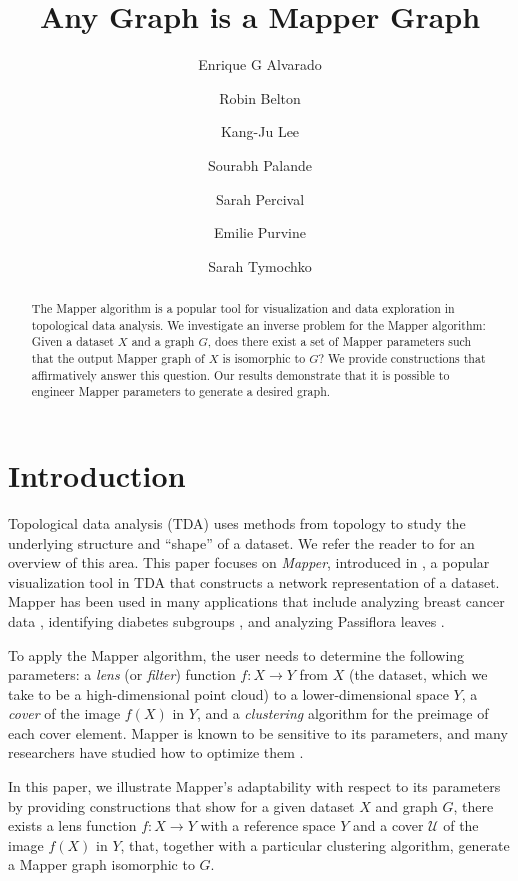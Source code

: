 \documentclass[reqno,oneside,11pt]{amsart}
\title[Any Graph is a Mapper Graph]
    {Any Graph is a Mapper Graph}
\author[Enrique G Alvarado]{Enrique G Alvarado}
\author[Robin Belton]{Robin Belton}
\author[Kang-Ju Lee]{Kang-Ju Lee}
\author[Sourabh Palande]{Sourabh Palande}
\author[Sarah Percival]{Sarah Percival}
\author[Emilie Purvine]{Emilie Purvine}
\author[Sarah Tymochko]{Sarah Tymochko}
\theoremstyle{definition}
\theoremstyle{remark}
\begin{document}
\begin{abstract}
The Mapper algorithm is a popular tool for visualization and data exploration in topological data analysis. We investigate an inverse problem for the Mapper algorithm: Given a dataset $X$ and a graph $G$, does there exist a set of Mapper parameters such that the output Mapper graph of $X$ is isomorphic to $G$? We provide constructions that affirmatively answer this question. Our results demonstrate that it is possible to engineer Mapper parameters to generate a desired graph. %
\end{abstract}

\maketitle 
%


\section{Introduction}
\label{sec:intro}


Topological data analysis (TDA) uses methods from topology to study the underlying structure and ``shape'' of a dataset. We refer the reader to \cite{carlsson2009topology} for an overview of this area. This paper focuses on \emph{Mapper}, introduced in \cite{singh2007topological}, a popular visualization tool in TDA that constructs a network representation of a dataset. Mapper has been used in many applications that include analyzing breast cancer data \cite{nicolau2011topology}, identifying diabetes subgroups \cite{li2015identification}, and analyzing Passiflora leaves \cite{percival2024topological}.

To apply the Mapper algorithm, the user needs to determine the following parameters: a \emph{lens} (or \emph{filter}) function $f \colon X \to Y$ from $X$ (the dataset, which we take to be a high-dimensional point cloud) to a lower-dimensional space $Y$, a \emph{cover} of the image $f(X)$ in $Y$, and a \emph{clustering} algorithm for the preimage of each cover element. Mapper is known to be sensitive to its parameters, and many researchers have studied how to optimize them \cite{johanssonCertified20, chalapathi2021adaptive, bui2020f,alvarado2023g, oulhaj2024differentiable, oulhaj2024deep}. 

In this paper, we illustrate Mapper's adaptability with respect to its parameters by providing constructions that show for a given dataset $X$ and graph $G$, there exists a lens function $f \colon X \to Y$ with a reference space $Y$ and a cover $\mathcal{U}$ of the image $f(X)$ in $Y$, that, together with a particular clustering algorithm, generate a Mapper graph isomorphic to $G$.
\end{document}
